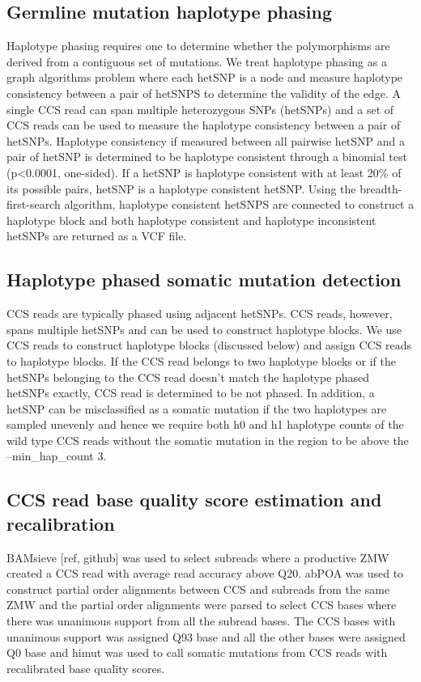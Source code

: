 \subsection{Germline mutation haplotype phasing}

Haplotype phasing requires one to determine whether the polymorphisms are derived from a contiguous set of mutations. We treat haplotype phasing as a graph algorithms problem where each hetSNP is a node and measure haplotype consistency between a pair of hetSNPS to determine the validity of the edge. A single CCS read can span multiple heterozygous SNPs (hetSNPs) and a set of CCS reads can be used to measure the haplotype consistency between a pair of hetSNPs. Haplotype consistency if measured between all pairwise hetSNP and a pair of hetSNP is determined to be haplotype consistent through a binomial test (p<0.0001, one-sided). If a hetSNP is haplotype consistent with at least 20\% of its possible pairs, hetSNP is a haplotype consistent hetSNP. Using the breadth-first-search algorithm, haplotype consistent hetSNPS are connected to construct a haplotype block and both haplotype consistent and haplotype inconsistent hetSNPs are returned as a VCF file. 

\subsection{Haplotype phased somatic mutation detection}

CCS reads are typically phased using adjacent hetSNPs. CCS reads, however, spans multiple hetSNPs and can be used to construct haplotype blocks. We use CCS reads to construct haplotype blocks (discussed below) and assign CCS reads to haplotype blocks. If the CCS read belongs to two haplotype blocks or if the hetSNPs belonging to the CCS read doesn’t match the haplotype phased hetSNPs exactly, CCS read is determined to be not phased. In addition, a hetSNP can be misclassified as a somatic mutation if the two haplotypes are sampled unevenly and hence we require both h0 and h1 haplotype counts of the wild type CCS reads without the somatic mutation in the region to be above the --min\_hap\_count 3. 

\subsection{CCS read base quality score estimation and recalibration}

BAMsieve [ref, github] was used to select subreads where a productive ZMW created a CCS read with average read accuracy above Q20. abPOA \cite{Gao2021-nf} was used to construct partial order alignments between CCS and subreads from the same ZMW and the partial order alignments were parsed to select CCS bases where there was unanimous support from all the subread bases. The CCS bases with unanimous support was assigned Q93 base and all the other bases were assigned Q0 base and himut was used to call somatic mutations from CCS reads with recalibrated base quality scores. 

